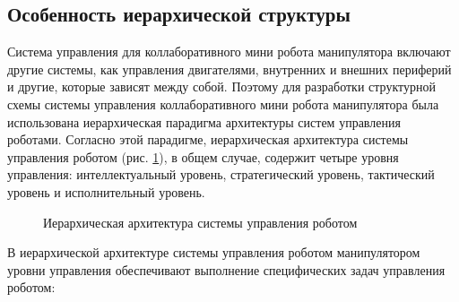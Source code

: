 \subsection{Особенность иерархической структуры}

Система управления для коллаборативного мини робота манипулятора включают другие системы, как управления двигателями, внутренних и внешних периферий и другие, которые зависят между собой. Поэтому для разработки структурной схемы системы управления коллаборативного мини робота манипулятора была использована иерархическая парадигма архитектуры систем управления роботами. Согласно этой парадигме, иерархическая архитектура системы управления роботом (рис. \ref{Hierar}), в общем случае, содержит четыре уровня управления: интеллектуальный уровень, стратегический уровень, тактический уровень и исполнительный уровень\citep{Khatib1997}.

\begin{figure}[H]
	\centering
	
	\caption{Иерархическая архитектура системы управления роботом}
	\label{Hierar}
\end{figure}

В иерархической архитектуре системы управления роботом манипулятором уровни управления обеспечивают выполнение специфических задач управления роботом:

